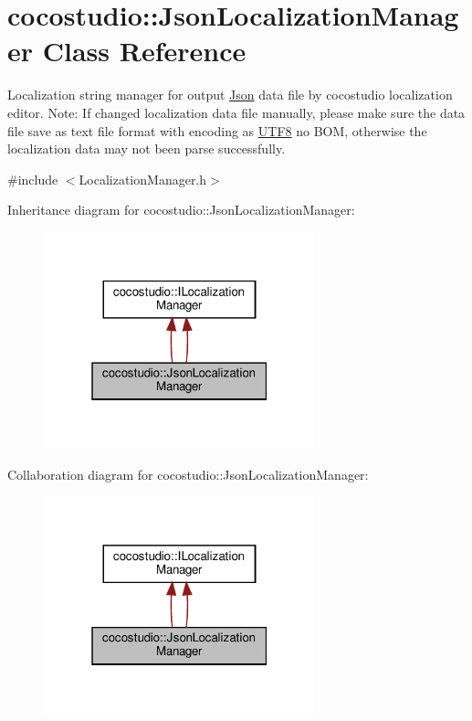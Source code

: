 \hypertarget{classcocostudio_1_1JsonLocalizationManager}{}\section{cocostudio\+:\+:Json\+Localization\+Manager Class Reference}
\label{classcocostudio_1_1JsonLocalizationManager}


Localization string manager for output \hyperlink{structJson}{Json} data file by cocostudio localization editor. Note\+: If changed localization data file manually, please make sure the data file save as text file format with encoding as \textquotesingle{}\hyperlink{structUTF8}{U\+T\+F8} no B\+OM\textquotesingle{}, otherwise the localization data may not been parse successfully.  




{\ttfamily \#include $<$Localization\+Manager.\+h$>$}



Inheritance diagram for cocostudio\+:\+:Json\+Localization\+Manager\+:
\nopagebreak
\begin{figure}[H]
\begin{center}
\leavevmode
\includegraphics[width=223pt]{classcocostudio_1_1JsonLocalizationManager__inherit__graph}
\end{center}
\end{figure}


Collaboration diagram for cocostudio\+:\+:Json\+Localization\+Manager\+:
\nopagebreak
\begin{figure}[H]
\begin{center}
\leavevmode
\includegraphics[width=223pt]{classcocostudio_1_1JsonLocalizationManager__coll__graph}
\end{center}
\end{figure}
